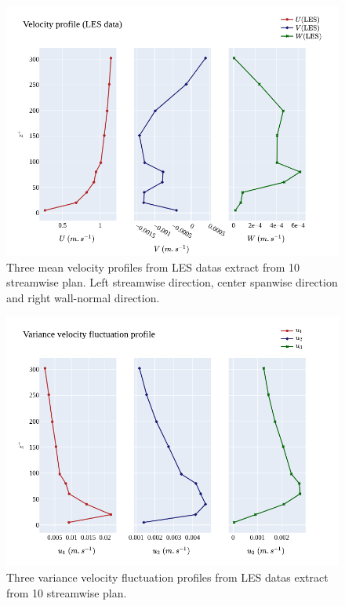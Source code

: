 \documentclass[]{article}
\theoremstyle{plain}
\theoremstyle{remark}
\begin{document}
\begin{figure}[h!]
	\begin{center}
		\includegraphics[width=\textwidth]{../output/RANS/mean_velocity_profiles.png}
		\caption{Three mean velocity profiles from LES datas extract from 10 streamwise plan. Left streamwise direction, center spanwise direction and right wall-normal direction.}
	\end{center}
\end{figure}

\begin{figure}[h!]
	\begin{center}
		\includegraphics[width=\textwidth]{../output/RANS/var_velocity_profiles.png}
		\caption{Three variance velocity fluctuation profiles from LES datas extract from 10 streamwise plan.}
	\end{center}
\end{figure}
\end{document}
